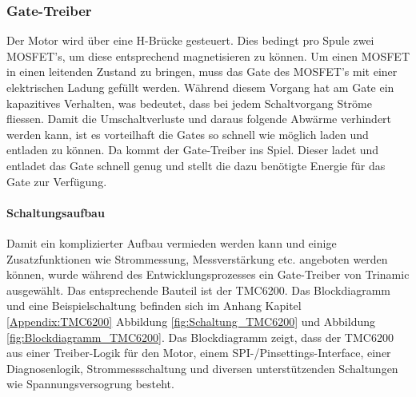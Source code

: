 \clearpage
\subsubsection{Gate-Treiber}
\label{subsubsec:Gate-Treiber}


Der Motor wird über eine H-Brücke gesteuert. Dies bedingt pro Spule zwei MOSFET's, um diese entsprechend magnetisieren zu können. Um einen MOSFET in einen leitenden Zustand zu bringen, muss das Gate des MOSFET's mit einer elektrischen Ladung gefüllt werden. Während diesem Vorgang hat am Gate ein kapazitives Verhalten, was bedeutet, dass bei jedem Schaltvorgang Ströme fliessen. Damit die Umschaltverluste und daraus folgende Abwärme verhindert werden kann, ist es vorteilhaft die Gates so schnell wie möglich laden und entladen zu können. Da kommt der Gate-Treiber ins Spiel. Dieser ladet und entladet das Gate schnell genug und stellt die dazu benötigte Energie für das Gate zur Verfügung.

\paragraph{Schaltungsaufbau}\mbox{}

Damit ein komplizierter Aufbau vermieden werden kann und einige Zusatzfunktionen wie Strommessung, Messverstärkung etc. angeboten werden können, wurde während des Entwicklungsprozesses ein Gate-Treiber von Trinamic ausgewählt. Das entsprechende Bauteil ist der TMC6200. Das Blockdiagramm und eine Beispielschaltung befinden sich im Anhang Kapitel \ref{Appendix:TMC6200} Abbildung \ref{fig:Schaltung_TMC6200} und Abbildung \ref{fig:Blockdiagramm_TMC6200}. Das Blockdiagramm zeigt, dass der TMC6200 aus einer Treiber-Logik für den Motor, einem SPI-/Pinsettings-Interface, einer Diagnosenlogik, Strommessschaltung und diversen unterstützenden Schaltungen wie Spannungsversogrung besteht.

